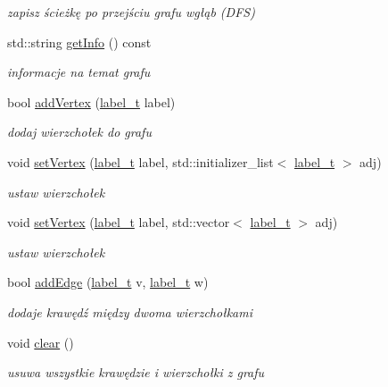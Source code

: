 \begin{DoxyCompactItemize}
\begin{DoxyCompactList}\small\item\em zapisz ścieżkę po przejściu grafu wgłąb (D\-F\-S) \end{DoxyCompactList}\item 
std\-::string \hyperlink{classGraph_a74e18e8a9825e77323ebfcc70b718380}{get\-Info} () const 
\begin{DoxyCompactList}\small\item\em informacje na temat grafu \end{DoxyCompactList}\item 
bool \hyperlink{classGraph_a96fc255863c32f9f7d1920ca4a2570fe}{add\-Vertex} (\hyperlink{classGraph_a2237a0ada8484c37b8200c0e3685ca71}{label\-\_\-t} label)
\begin{DoxyCompactList}\small\item\em dodaj wierzchołek do grafu \end{DoxyCompactList}\item 
void \hyperlink{classGraph_ac4d679a954ffea0b463d6b559aec8597}{set\-Vertex} (\hyperlink{classGraph_a2237a0ada8484c37b8200c0e3685ca71}{label\-\_\-t} label, std\-::initializer\-\_\-list$<$ \hyperlink{classGraph_a2237a0ada8484c37b8200c0e3685ca71}{label\-\_\-t} $>$ adj)
\begin{DoxyCompactList}\small\item\em ustaw wierzchołek \end{DoxyCompactList}\item 
void \hyperlink{classGraph_a2c638cac3d3bb7b47b1aef864b2c6a69}{set\-Vertex} (\hyperlink{classGraph_a2237a0ada8484c37b8200c0e3685ca71}{label\-\_\-t} label, std\-::vector$<$ \hyperlink{classGraph_a2237a0ada8484c37b8200c0e3685ca71}{label\-\_\-t} $>$ adj)
\begin{DoxyCompactList}\small\item\em ustaw wierzchołek \end{DoxyCompactList}\item 
bool \hyperlink{classGraph_a7f214a25b838ec94dff78062364694f5}{add\-Edge} (\hyperlink{classGraph_a2237a0ada8484c37b8200c0e3685ca71}{label\-\_\-t} v, \hyperlink{classGraph_a2237a0ada8484c37b8200c0e3685ca71}{label\-\_\-t} w)
\begin{DoxyCompactList}\small\item\em dodaje krawędź między dwoma wierzchołkami \end{DoxyCompactList}\item 
void \hyperlink{classGraph_ac6192a41101102ca8aa6acca607c84f3}{clear} ()
\begin{DoxyCompactList}\small\item\em usuwa wszystkie krawędzie i wierzchołki z grafu \end{DoxyCompactList}\item 

\end{DoxyCompactItemize}
